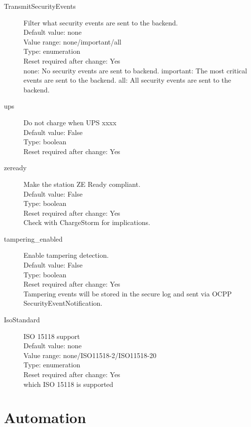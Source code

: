 \begin{description}
\item[TransmitSecurityEvents] Filter what security events are sent to the backend.\\
  Default value: none\\
  Value range: none/important/all\\
  Type: enumeration\\
  Reset required after change: Yes\\
  none: No security events are sent to backend. important: The most critical events are sent to the backend. all: All security events are sent to the backend.\\

\item[ups] Do not charge when UPS xxxx\\
  Default value: False\\
  Type: boolean\\
  Reset required after change: Yes\\

\item[zeready] Make the station ZE Ready compliant.\\
  Default value: False\\
  Type: boolean\\
  Reset required after change: Yes\\
  Check with ChargeStorm for implications.\\

\item[tampering\_enabled] Enable tampering detection.\\
  Default value: False\\
  Type: boolean\\
  Reset required after change: Yes\\
  Tampering events will be stored in the secure log and sent via OCPP SecurityEventNotification.\\

\item[IsoStandard] ISO 15118 support\\
  Default value: none\\
  Value range: none/ISO11518-2/ISO11518-20\\
  Type: enumeration\\
  Reset required after change: Yes\\
  which ISO 15118 is supported\\

\end{description}
\pagebreak\section{Automation}

